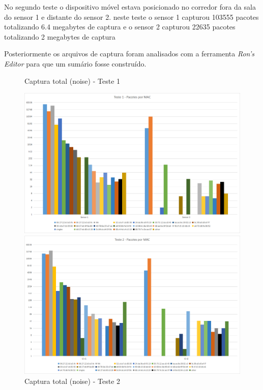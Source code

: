 No segundo teste o dispositivo móvel estava posicionado no corredor fora da sala do sensor 1
e distante do sensor 2.  neste teste o sensor 1 capturou 103555 pacotes totalizando 6.4 megabytes
de captura e o sensor 2 capturou 22635 pacotes totalizando 2 megabytes de captura

Posteriormente os arquivos de captura foram analisados com a ferramenta
\emph{Ron’s Editor} para que um sumário fosse construído.

\begin{figure}[htb]
	\label{mg4-noise}
	\centering
	\begin{minipage}{0.49\textwidth}
	\centering
		\caption{\label{fig-mg4-noise-t1}Captura total (noise) - Teste 1}
		\includegraphics[width=1\textwidth]{060-testes/data-analisis/distance-mg4plus-netflix/Teste1.png}
	\end{minipage}
	\hfill
	\begin{minipage}{0.49\textwidth}
	\centering
		\caption{\label{fig-mg4-noise-t2}Captura total (noise) - Teste 2}
		\includegraphics[width=1\textwidth]{060-testes/data-analisis/distance-mg4plus-netflix/Teste2.png}
	\end{minipage}
\end{figure}


